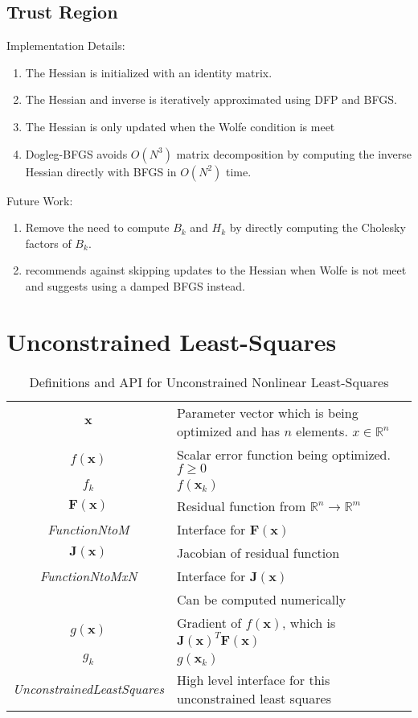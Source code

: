 \documentclass[peerreview,compsoc,onecolumn]{IEEEtran}
\newcommand{\R}{\mathbb{R}}
\newenvironment{enumargin}[1]{\begin{enumerate}[leftmargin=#1\textwidth , rightmargin=#1\textwidth]}{\end{enumerate}}
\begin{document}
\subsection{Trust Region}

Implementation Details:
\begin{enumargin}{0.2}
    \item The Hessian is initialized with an identity matrix. 
	\item The Hessian and inverse is iteratively approximated using DFP and BFGS.
	\item The Hessian is only updated when the Wolfe condition is meet
	\item Dogleg-BFGS avoids $O(N^3)$ matrix decomposition by computing the inverse Hessian directly with BFGS in $O(N^2)$ time.
\end{enumargin}

Future Work:
\begin{enumargin}{0.2}
	\item Remove the need to compute $B_k$ and $H_k$ by directly computing the Cholesky factors of $B_k$. 
	\item \cite{numopt2006} recommends against skipping updates to the Hessian when Wolfe is not meet and suggests using a damped BFGS instead.
\end{enumargin}

\section{Unconstrained Least-Squares}
\begin{table*}[h]
\centering
\begin{tabular}{cl}
$\bm{x}$ & Parameter vector which is being optimized and has $n$ elements. $x \in \R^n$ \\
$f(\bm{x})$ & Scalar error function being optimized. $f \ge 0$ \\
$f_k$ & $f(\bm{x}_k)$ \\
$\bm{F}(\bm{x})$ &  Residual function from $\mathbb{R}^n \rightarrow \R^m$ \\
\textit{FunctionNtoM} & Interface for $\bm{F}(\bm{x})$ \\
$\bm{J}(\bm{x})$ & Jacobian of residual function \\
\textit{FunctionNtoMxN} & Interface for $\bm{J}(\bm{x})$ \\
 & Can be computed numerically \\
$g(\bm{x})$ & Gradient of $f(\bm{x})$, which is $\bm{J}(\bm{x})^T  \bm{F}(\bm{x})$ \\
$g_k$ & $g(\bm{x}_k)$ \\
\textit{UnconstrainedLeastSquares} & High level interface for this unconstrained least squares
\end{tabular}
\caption{\label{definitions:UNLS}Definitions and API for Unconstrained Nonlinear Least-Squares}
\end{table*}
\end{document}
